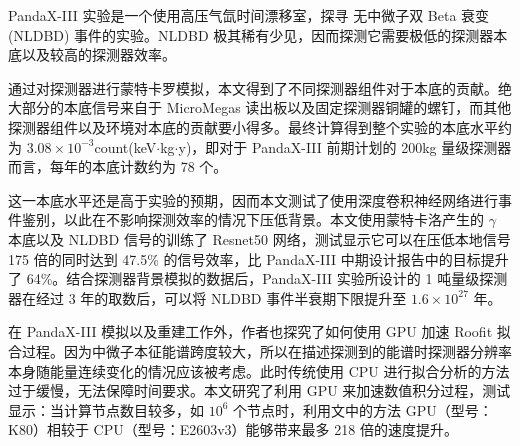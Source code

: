 
\pkuthssffaq %

PandaX-III 实验是一个使用高压气氙时间漂移室，探寻 \xeots 无中微子双 Beta 衰变 (NLDBD) 事件的实验。NLDBD 极其稀有少见，因而探测它需要极低的探测器本底以及较高的探测器效率。

通过对探测器进行蒙特卡罗模拟，本文得到了不同探测器组件对于本底的贡献。绝大部分的本底信号来自于 MicroMegas 读出板以及固定探测器铜罐的螺钉，而其他探测器组件以及环境对本底的贡献要小得多。最终计算得到整个实验的本底水平约为 $3.08\times 10^{-3}$count\/(keV$\cdot$kg$\cdot$y)，即对于 PandaX-III 前期计划的 200kg 量级探测器而言，每年的本底计数约为 78 个。

这一本底水平还是高于实验的预期，因而本文测试了使用深度卷积神经网络进行事件鉴别，以此在不影响探测效率的情况下压低背景。本文使用蒙特卡洛产生的 $\gamma$ 本底以及 NLDBD 信号的训练了 Resnet50 网络，测试显示它可以在压低本地信号 175 倍的同时达到 47.5\% 的信号效率，比 PandaX-III 中期设计报告中的目标提升了 64\%。结合探测器背景模拟的数据后，PandaX-III 实验所设计的 1 吨量级探测器在经过 3 年的取数后，可以将 \xeots NLDBD 事件半衰期下限提升至 $1.6\times10^{27}$ 年。

在 PandaX-III 模拟以及重建工作外，作者也探究了如何使用 GPU 加速 Roofit 拟合过程。因为中微子本征能谱跨度较大，所以在描述探测到的能谱时探测器分辨率本身随能量连续变化的情况应该被考虑。此时传统使用 CPU 进行拟合分析的方法过于缓慢，无法保障时间要求。本文研究了利用 GPU 来加速数值积分过程，测试显示：当计算节点数目较多，如 $10^{6}$ 个节点时，利用文中的方法 GPU（型号：K80）相较于 CPU（型号：E2603v3）能够带来最多 218 倍的速度提升。


